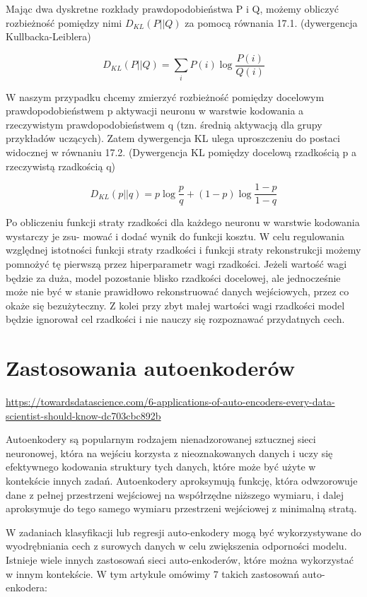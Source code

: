 \documentclass[12pt]{mwbk}
\theoremstyle{plain}
\theoremstyle{definition}
\theoremstyle{remark}
\begin{document}
Mając dwa dyskretne rozkłady prawdopodobieństwa P i Q, możemy obliczyć rozbieżność pomiędzy nimi $D_{KL}(P||Q)$ za pomocą równania 17.1. (dywergencja Kullbacka-Leiblera)

$$D_{KL}(P||Q)=\sum_i P(i)\log \frac{P(i)}{Q(i)}$$

W naszym przypadku chcemy zmierzyć rozbieżność pomiędzy docelowym prawdopodobieństwem p
aktywacji neuronu w warstwie kodowania a rzeczywistym prawdopodobieństwem q (tzn. średnią
aktywacją dla grupy przykładów uczących). Zatem dywergencja KL ulega uproszczeniu do postaci
widocznej w równaniu 17.2. (Dywergencja KL pomiędzy docelową rzadkością p a rzeczywistą rzadkością q)

$$D_{KL}(p||q)=p\log \frac{p}{q}+(1-p)\log \frac{1-p}{1-q}$$

Po obliczeniu funkcji straty rzadkości dla każdego neuronu w warstwie kodowania wystarczy je zsu-
mować i dodać wynik do funkcji kosztu. W celu regulowania względnej istotności funkcji straty
rzadkości i funkcji straty rekonstrukcji możemy pomnożyć tę pierwszą przez hiperparametr wagi
rzadkości. Jeżeli wartość wagi będzie za duża, model pozostanie blisko rzadkości docelowej, ale
jednocześnie może nie być w stanie prawidłowo rekonstruować danych wejściowych, przez co okaże się bezużyteczny. Z kolei przy zbyt małej wartości wagi rzadkości model będzie ignorował cel rzadkości
i nie nauczy się rozpoznawać przydatnych cech.

\section{Zastosowania autoenkoderów}

\url{https://towardsdatascience.com/6-applications-of-auto-encoders-every-data-scientist-should-know-dc703cbc892b}

Autoenkodery są popularnym rodzajem nienadzorowanej sztucznej sieci neuronowej, która na wejściu korzysta z nieoznakowanych danych i uczy się efektywnego kodowania struktury tych danych, które może być użyte w kontekście innych zadań. Autoenkodery aproksymują funkcję, która odwzorowuje dane z pełnej przestrzeni wejściowej na współrzędne niższego wymiaru, i dalej aproksymuje do tego samego wymiaru przestrzeni wejściowej z minimalną stratą.

W zadaniach klasyfikacji lub regresji auto-enkodery mogą być wykorzystywane do wyodrębniania cech z surowych danych w celu zwiększenia odporności modelu. Istnieje wiele innych zastosowań sieci auto-enkoderów, które można wykorzystać w innym kontekście. W tym artykule omówimy 7 takich zastosowań auto-enkodera:
\end{document}

